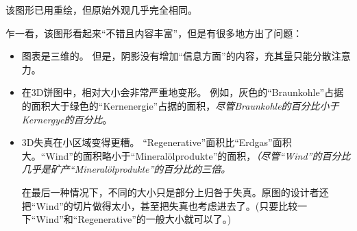 该图形已用\tikzname 重绘，但原始外观几乎完全相同。


乍一看，该图形看起来``不错且内容丰富''，但是有很多地方出了问题：

%
\begin{itemize}
    \item 图表是三维的。 但是，阴影没有增加``信息方面''的内容，充其量只能分散注意力。
    \item 在3D饼图中，相对大小会非常严重地变形。 例如，灰色的``Braunkohle''占据的面积大于绿色的``Kernenergie''占据的面积，\emph{尽管Braunkohle的百分比小于Kernergye的百分比}。


    \item 3D失真在小区域变得更糟。  ``Regenerative''面积比``Erdgas''面积大。``Wind''的面积略小于``Mineral\"olprodukte''的面积，\emph{（尽管``Wind''的百分比几乎是矿产``Mineral\"olprodukte''的百分比的三倍。}

    在最后一种情况下，不同的大小只是部分上归咎于失真。原图的设计者还把``Wind''的切片做得太小，甚至把失真也考虑进去了。(只要比较一下``Wind''和``Regenerative''的一般大小就可以了。)


\end{itemize}
